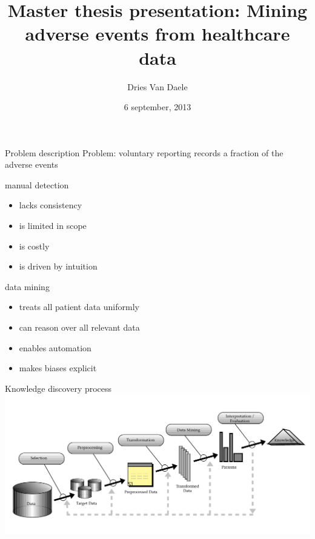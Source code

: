 \documentclass{beamer}
\title[Master thesis presentation: Mining adverse events from healthcare data]
{Master thesis presentation: Mining adverse events from healthcare data}
\author[Dries Van Daele]{Dries Van Daele}
\institute{KU Leuven, DTAI}
\date{6 september, 2013}
\begin{document}
\begin{frame}{}
  \titlepage
\end{frame}

\begin{frame}{Problem description}
Problem: voluntary reporting records a fraction of the adverse events\vspace{3 mm}


manual detection
\begin{itemize}
\item lacks consistency
\item is limited in scope
\item is costly
\item is driven by intuition
\end{itemize}
data mining
\begin{itemize}
\item treats all patient data uniformly
\item can reason over all relevant data
\item enables automation
\item makes biases explicit
\end{itemize}
\end{frame}


\begin{frame}{Knowledge discovery process}
\includegraphics[width=\textwidth,height=.88\textheight,keepaspectratio]{kdd}
\end{frame}


\end{document}
